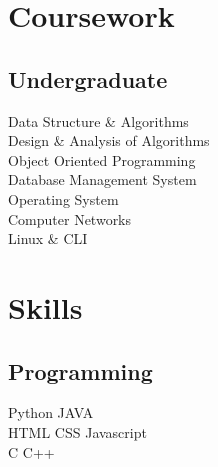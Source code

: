 \documentclass[]{swapnanil-resume}
\begin{document}
\begin{minipage}[t]{0.33\textwidth}
\sectionsep

\section{Coursework}
\subsection{Undergraduate}
Data Structure \& Algorithms \\
Design \& Analysis of Algorithms \\
Object Oriented Programming \\
Database Management System \\
Operating System \\
Computer Networks \\
Linux \& CLI
\sectionsep


\section{Skills}
\subsection{Programming}
Python \textbullet{}  JAVA\\
HTML \textbullet{} CSS \textbullet{} Javascript \\
C \textbullet{} C++  \\

%
%
\end{minipage} 
\hfill
\end{document}
